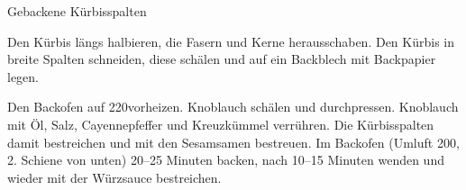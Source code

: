 \begin{recipe}[\vegan]{Gebackene Kürbisspalten}

    \begin{ingredients}
    \end{ingredients}
    
    \begin{instructions}
        Den Kürbis längs halbieren, die Fasern und Kerne herausschaben.
        Den Kürbis in breite Spalten schneiden, diese schälen und auf ein Backblech mit Backpapier legen.

        Den Backofen auf 220\degC vorheizen.
        Knoblauch schälen und durchpressen.
        Knoblauch mit Öl, Salz, Cayennepfeffer und Kreuzkümmel verrühren.
        Die Kürbisspalten damit bestreichen und mit den Sesamsamen bestreuen.
        Im Backofen (Umluft 200\degC, 2. Schiene von unten) 20--25 Minuten backen, nach 10--15 Minuten wenden und wieder mit der Würzsauce bestreichen.
    \end{instructions}
\end{recipe}
